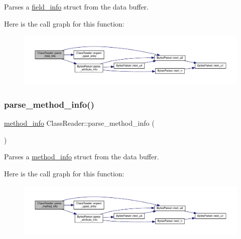Parses a \hyperlink{structfield__info}{field\+\_\+info} struct from the data buffer. 

Here is the call graph for this function\+:
\nopagebreak
\begin{figure}[H]
\begin{center}
\leavevmode
\includegraphics[width=350pt]{classClassReader_a434b73f04e1502c936593ab63094d838_cgraph}
\end{center}
\end{figure}
\mbox{\label{classClassReader_a0eb68204b1979e2a2758c05f200a7be3}} 
\subsubsection{\texorpdfstring{parse\+\_\+method\+\_\+info()}{parse\_method\_info()}}
{\footnotesize\ttfamily \hyperlink{structmethod__info}{method\+\_\+info} Class\+Reader\+::parse\+\_\+method\+\_\+info (\begin{DoxyParamCaption}{ }\end{DoxyParamCaption})\hspace{0.3cm}{\ttfamily [private]}}



Parses a \hyperlink{structmethod__info}{method\+\_\+info} struct from the data buffer. 

Here is the call graph for this function\+:
\nopagebreak
\begin{figure}[H]
\begin{center}
\leavevmode
\includegraphics[width=350pt]{classClassReader_a0eb68204b1979e2a2758c05f200a7be3_cgraph}
\end{center}
\end{figure}


